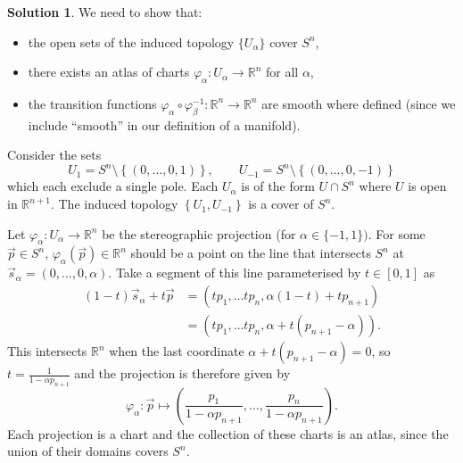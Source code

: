 \documentclass[11pt, a4paper]{article}
\theoremstyle{definition}
\newtheorem{sol}{Solution}[part]
\begin{document}
\begin{sol}

We need to show that:
\begin{itemize}
    \item the open sets of the induced topology $\{U_\alpha\}$ cover $S^n$,
    \item there exists an atlas of charts $\varphi_\alpha: U_\alpha \to \mathbb{R}^n$ for all $\alpha$,
    \item the transition functions $\varphi_\alpha \circ \varphi_\beta^{-1}: \mathbb{R}^n \to \mathbb{R}^n$ are smooth where defined (since we include ``smooth'' in our definition of a manifold).
\end{itemize}

Consider the sets
\[
    U_1 = S^n \setminus \left\{(0, \ldots, 0, 1)\right\}, \qquad
    U_{-1} = S^n \setminus \left\{(0, \ldots, 0, -1)\right\}
\]
which each exclude a single pole. Each $U_\alpha$ is of the form $U \cap S^n$ where $U$ is open in $\mathbb{R}^{n + 1}$.
The induced topology $\left\{U_1, U_{-1}\right\}$ is a cover of $S^n$.

Let $\varphi_\alpha: U_\alpha \to \mathbb{R}^n$ be the stereographic projection (for $\alpha \in \{-1, 1\})$.
For some $\vec{p} \in S^n$, $\varphi_\alpha(\vec{p}) \in \mathbb{R}^n$ should be a point on the line that intersects $S^n$ at $\vec{s}_\alpha = (0, \ldots, 0, \alpha)$.
Take a segment of this line parameterised by $t \in [0, 1]$ as
\begin{align*}
    (1 - t) \vec{s}_\alpha + t\vec{p} &= (t p_1, \ldots t p_n, \alpha(1 - t) + tp_{n + 1}) \\
        &= (t p_1, \ldots t p_n, \alpha + t(p_{n + 1} - \alpha)).
\end{align*}
This intersects $\mathbb{R}^n$ when the last coordinate $\alpha + t(p_{n + 1} - \alpha) = 0$, so $t = \frac{1}{1 - \alpha p_{n + 1}}$ and the projection is therefore given by
\[
    \varphi_\alpha: \vec{p} \mapsto \left(\frac{p_1}{1 - \alpha p_{n + 1}}, \ldots, \frac{p_n}{1 - \alpha p_{n + 1}}\right).
\]
Each projection is a chart and the collection of these charts is an atlas, since the union of their domains covers $S^n$.


\end{sol}
\end{document}

